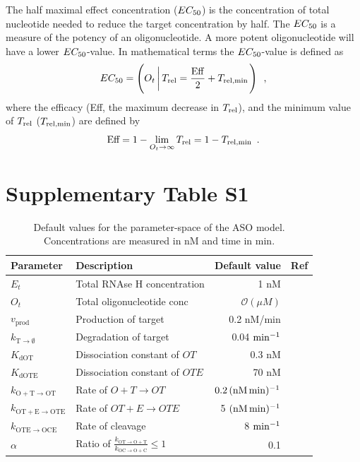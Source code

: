 \documentclass[a4paper,11pt]{article}
\newcommand{\kmo}{k_{\mathrm{OT \to O+T}}}
\newcommand{\kOpT}{k_{\mathrm{O+T \to OT}}}
\newcommand{\kt}{k_{\mathrm{OT+E \to OTE}}}
\newcommand{\kE}{k_{\mathrm{OTE \to OCE}}}
\newcommand{\kD}{k_{\mathrm{OC \to O+C}}}
\newcommand{\vp}{v_{\mathrm{prod}}}
\newcommand{\vd}{k_{\mathrm{T \to \emptyset}}}
\newcommand{\Trel}{T_{\rm{rel}}}
\newcommand{\EC}{EC_{\rm{50}}}
\newcommand{\KdOT}{K_{\mathrm{dOT}}}
\newcommand{\KdOTE}{K_{\mathrm{dOTE}}}
\newcommand{\Trelmin}{T_{\rm{rel,min}}}
\begin{document}
The half maximal effect concentration ($\EC$) is the concentration of total nucleotide needed to reduce the target concentration by half. The $\EC$ is a measure of the potency of an oligonucleotide. A more potent oligonucleotide will have a lower $\EC$-value. In mathematical terms the $\EC$-value is defined as
\begin{equation}
\EC = \left(O_t \left|\, \Trel = \frac{\mathrm{Eff}}{2}+\Trelmin \right.\right)  \enspace, \label{eq::EC50}
\end{equation}
where the efficacy (Eff, the maximum decrease in $\Trel$), and the minimum value of $\Trel$ ($\Trelmin$) are defined by
\begin{equation}
\textrm{Eff}=1-\lim_{O_t \to \infty} \Trel =1 - \Trelmin \label{eq:Eff} \enspace.
\end{equation}


\section{Supplementary Table S1}
\begin{table}[!h]
\caption{Default values for the parameter-space of the ASO model. Concentrations are measured in nM and time in min.}\label{tb::par}
\setlength\extrarowheight{5pt}  %
\begin{tabular}{| l | l | r | l |}
\hline
Parameter & Description &Default value & Ref  \\
\hline
$E_t$ & Total RNAse H concentration & 1 nM & \cite{Amirkhanov:2002vo}\\
$O_t$ & Total oligonucleotide conc & $\mathcal{O}(\mu M )$ & {}\\
$\vp$ & Production of target & 0.2 nM/min & \cite{lodish2008molecular}\\
$\vd$ & Degradation of target & 0.04 $\rm{min}^{-1}$ &  \cite{Yang:2003ja}\\
$\KdOT$ & Dissociation constant of $OT$ & 0.3 nM &  \cite{Christensen:2001te} \\
$\KdOTE$ & Dissociation constant of $OTE$  & 70 nM &  \cite{Amirkhanov:2002vo} \\
$\kOpT$ & Rate of $O+T \to OT$ & $0.2 \, (\rm{nM \,min})^{-1}$ &  \cite{Christensen:2001te}\\
$\kt$ & Rate of $OT+E \to OTE$  & 5 $(\rm{nM \,min})^{-1}$ &  \cite{Amirkhanov:2002vo}\\
$\kE$ & Rate of cleavage  & 8 $\rm{min}^{-1}$ & \cite{Amirkhanov:2002vo}\\
$\alpha$ & Ratio of $\frac{\kmo}{\kD} \le 1$ & 0.1  & {}\\
\hline
\end{tabular}
\end{table}
\end{document}
